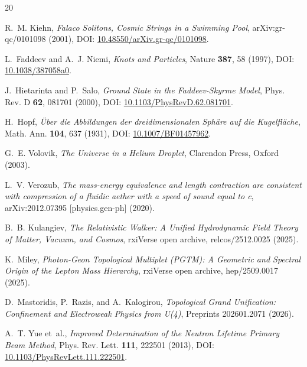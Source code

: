 \documentclass[11pt,a4paper]{article}
\begin{document}
	\begin{thebibliography}{20}
		
		R.~M. Kiehn, \emph{Falaco Solitons, Cosmic Strings in a Swimming Pool}, arXiv:gr-qc/0101098 (2001), DOI: \href{https://doi.org/10.48550/arXiv.gr-qc/0101098}{10.48550/arXiv.gr-qc/0101098}.
		
		L.~Faddeev and A.~J. Niemi, \emph{Knots and Particles}, Nature \textbf{387}, 58 (1997), DOI: \href{https://doi.org/10.1038/387058a0}{10.1038/387058a0}.
		
		J.~Hietarinta and P.~Salo, \emph{Ground State in the Faddeev-Skyrme Model}, Phys. Rev. D \textbf{62}, 081701 (2000), DOI: \href{https://doi.org/10.1103/PhysRevD.62.081701}{10.1103/PhysRevD.62.081701}.
		
		H.~Hopf, \emph{\"Uber die Abbildungen der dreidimensionalen Sph\"are auf die Kugelfl\"ache}, Math. Ann. \textbf{104}, 637 (1931), DOI: \href{https://doi.org/10.1007/BF01457962}{10.1007/BF01457962}.
		
		G.~E. Volovik, \emph{The Universe in a Helium Droplet}, Clarendon Press, Oxford (2003).
		
		L.~V. Verozub, \emph{The mass-energy equivalence and length contraction are consistent with compression of a fluidic aether with a speed of sound equal to c}, arXiv:2012.07395 [physics.gen-ph] (2020).
		
		B.~B. Kulangiev, \emph{The Relativistic Walker: A Unified Hydrodynamic Field Theory of Matter, Vacuum, and Cosmos}, rxiVerse open archive, relcos/2512.0025 (2025).
		
		K.~Miley, \emph{Photon-Geon Topological Multiplet (PGTM): A Geometric and Spectral Origin of the Lepton Mass Hierarchy}, rxiVerse open archive, hep/2509.0017 (2025).
		
		D.~Mastoridis, P.~Razis, and A.~Kalogirou, \emph{Topological Grand Unification: Confinement and Electroweak Physics from U(4)}, Preprints 202601.2071 (2026).
		
		A.~T. Yue et~al., \emph{Improved Determination of the Neutron Lifetime Primary Beam Method}, Phys. Rev. Lett. \textbf{111}, 222501 (2013), DOI: \href{https://doi.org/10.1103/PhysRevLett.111.222501}{10.1103/PhysRevLett.111.222501}.
		

\end{thebibliography}
\end{document}
